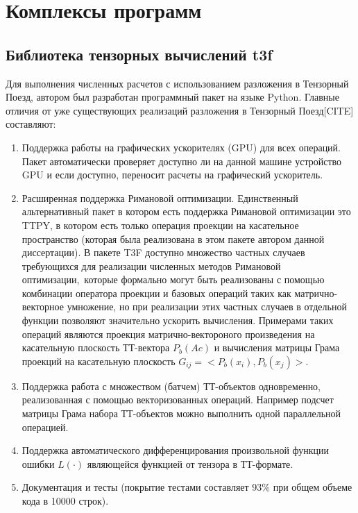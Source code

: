 \chapter{Комплексы программ} \label{chap:exm}
\section{Библиотека тензорных вычислений t3f} \label{sec:t3f}
Для выполнения численных расчетов с использованием разложения в Тензорный Поезд, автором был разработан программный пакет на языке Python. Главные отличия от уже существующих реализаций разложения в Тензорный Поезд[CITE] составляют:
\begin{enumerate}
	\item Поддержка работы на графических ускорителях (GPU) для всех операций. Пакет автоматически проверяет доступно ли на данной машине устройство GPU и если доступно, переносит расчеты на графический ускоритель.
	\item Расширенная поддержка Римановой оптимизации. Единственный альтернативный пакет в котором есть поддержка Римановой оптимизации это TTPY, в котором есть только операция проекции на касательное пространство (которая была реализована в этом пакете автором данной диссертации). В пакете T3F доступно множество частных случаев требующихся для реализации численных методов Римановой оптимизации, которые формально могут быть реализованы с помощью комбинации оператора проекции и базовых операций таких как матрично-векторное умножение, но при реализации этих частных случаев в отдельной функции позволяют значительно ускорить вычисления. Примерами таких операций являются проекция матрично-вектороного произведения на касательную плоскость ТТ-вектора $P_b(A c)$ и вычисления матрицы Грама проекций на касательную плоскость $G_{ij} = <P_b(x_i), P_b(x_j)>$.
	\item Поддержка работа с множеством (батчем) ТТ-объектов одновременно, реализованная с помощью векторизованных операций. Например подсчет матрицы Грама набора ТТ-объектов можно выполнить одной параллельной операцией.
	\item Поддержка автоматического дифференцирования произвольной функции ошибки $L(\cdot)$ являющейся функцией от тензора в ТТ-формате.
	\item Документация и тесты (покрытие тестами составляет 93\% при общем объеме кода в 10000 строк).
\end{enumerate}

